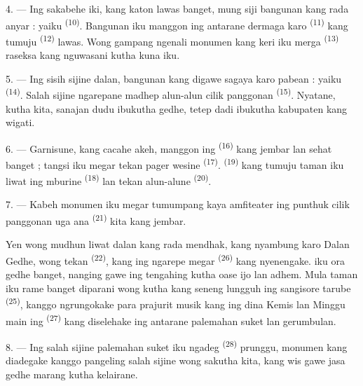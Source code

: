 4. --- Ing sakabehe  iki, kang katon lawas banget, mung
siji bangunan kang rada anyar : yaiku 
\textsuperscript{(10)}. Bangunan iku manggon ing antarane dermaga karo
 \textsuperscript{(11)} kang tumuju  \textsuperscript{(12)} lawas. Wong gampang ngenali monumen kang
keri iku merga  \textsuperscript{(13)} raseksa kang
nguwasani kutha kuna iku.

5. --- Ing sisih sijine dalan,  bangunan kang digawe
sagaya karo pabean : yaiku  \textsuperscript{(14)}. Salah
sijine ngarepane madhep alun-alun cilik panggonan  \textsuperscript{(15)}. Nyatane, kutha kita, sanajan dudu
ibukutha gedhe, tetep dadi ibukutha kabupaten kang wigati.

\VUsaut{5.0mm}
\VUsaut{3.4mm}

6. --- Garnisune, kang cacahe akeh, manggon ing 
\textsuperscript{(16)} kang jembar lan sehat banget ; tangsi iku megar
tekan pager wesine  \textsuperscript{(17)}.
 \textsuperscript{(19)} kang tumuju taman iku liwat ing
mburine  \textsuperscript{(18)} lan tekan alun-alune
 \textsuperscript{(20)}.

7. --- Kabeh monumen iku megar tumumpang kaya amfiteater ing punthuk
cilik panggonan uga ana  \textsuperscript{(21)}
kita kang jembar.

Yen wong mudhun liwat dalan kang rada mendhak, kang nyambung karo Dalan
Gedhe, wong tekan  \textsuperscript{(22)}, kang ing
ngarepe megar  \textsuperscript{(26)} kang nyenengake.
 iku ora gedhe banget, nanging gawe ing
tengahing kutha oase ijo lan adhem. Mula taman iku rame banget
diparani wong kutha kang seneng lungguh ing sangisore tarube
 \textsuperscript{(25)}, kanggo ngrungokake para
prajurit musik kang ing dina Kemis lan Minggu main ing
 \textsuperscript{(27)} kang diselehake ing
antarane palemahan suket lan gerumbulan.

8. --- Ing salah sijine palemahan suket iku ngadeg 
\textsuperscript{(28)} prunggu, monumen kang diadegake kanggo pangeling
salah sijine wong sakutha kita, kang wis gawe jasa gedhe marang kutha
kelairane.

